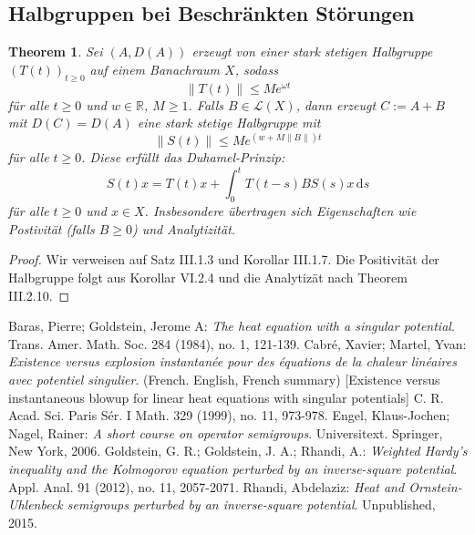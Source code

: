 \documentclass[11pt]{article}
\newtheorem{thm}{Theorem}
\theoremstyle{break}
\begin{document}
\subsection{Halbgruppen bei Beschr\"ankten St\"orungen}
\begin{thm}\label{bounded}
Sei $(A, D(A))$ erzeugt von einer stark stetigen Halbgruppe $(T(t))_{t\ge 0}$ auf einem Banachraum $X$, sodass
\begin{equation}
\|T(t)\|\le M e^{\omega t}
\end{equation}
f\"ur alle $t\ge 0$ und $w\in \mathbb R$, $M\ge 1$. Falls $B\in \mathcal L(X)$, dann erzeugt $C:=A+B$ mit $D(C)=D(A)$ eine stark stetige Halbgruppe mit
\begin{equation}
\|S(t)\|\le M e^{(w+ M\|B\|) t}
\end{equation}
f\"ur alle $t\ge 0$. Diese erf\"ullt das \emph{Duhamel-Prinzip}:
\begin{equation}
S(t) x = T(t) x + \int_0^t T(t-s) B S(s) x \,\mathrm ds
\end{equation}
f\"ur alle $t\ge 0$ und $x\in X$. Insbesondere \"ubertragen sich Eigenschaften wie Postivit\"at (falls $B\ge 0$) und Analytizit\"at.
\end{thm}
\begin{proof}
Wir verweisen auf \cite{engel-nagel} Satz III.1.3 und Korollar III.1.7. Die Positivit\"at der Halbgruppe folgt aus \cite{engel-nagel} Korollar VI.2.4 und die Analytiz\"at nach Theorem III.2.10. 
\end{proof}

\begin{thebibliography}{tief}
 Baras, Pierre; Goldstein, Jerome A:
{\it The heat equation with a singular potential}.
Trans. Amer. Math. Soc. 284 (1984), no. 1, 121-139.
 Cabr\'e, Xavier; Martel, Yvan:
{\it Existence versus explosion instantan\'ee pour des \'equations de la chaleur lin\'eaires avec potentiel singulier}. (French. English, French summary) [Existence versus instantaneous blowup for linear heat equations with singular potentials]
C. R. Acad. Sci. Paris S\'er. I Math. 329 (1999), no. 11, 973-978. 
 Engel, Klaus-Jochen; Nagel, Rainer:
{\it A short course on operator semigroups}. Universitext. Springer, New York, 2006.
 Goldstein, G. R.; Goldstein, J. A.; Rhandi, A.: {\it Weighted Hardy's inequality and the Kolmogorov equation perturbed by an inverse-square potential}.
Appl. Anal. 91 (2012), no. 11, 2057-2071. 
 Rhandi, Abdelaziz: {\it Heat and Ornstein-Uhlenbeck semigroups perturbed by an inverse-square potential}. 
                     Unpublished, 2015.
\end{thebibliography} 
\end{document}

